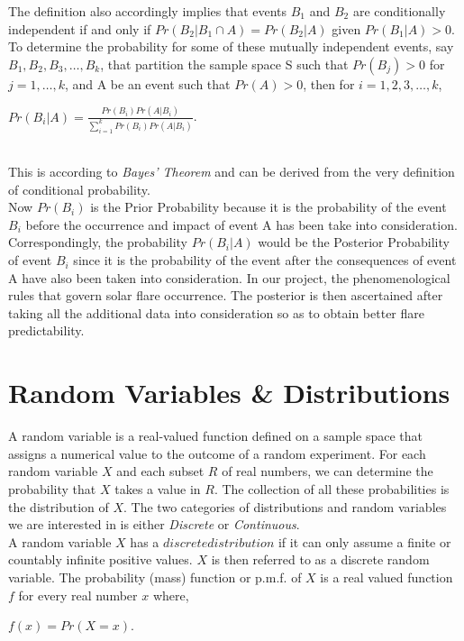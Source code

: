 \documentclass[12pt,twoside]{reedthesis}
\begin{document}
\begin{enumerate}
\begin{enumerate}
The definition also accordingly implies that events $B_1$ and $B_2$ are conditionally independent if and only if $Pr(B_2 | B_1 \cap A) = Pr(B_2 | A)$ given $Pr(B_1 | A) > 0$. \\

To determine the probability for some of these mutually independent events, say $B_1, B_2, B_3, \dotsc, B_k$, that partition the sample space S such that $Pr(B_j) > 0$ for $j = 1, \dotsc, k$, and A be an event such that $Pr(A) > 0$, then for $i = 1, 2, 3, \dotsc , k$,
\begin{center}
$Pr(B_i | A) =  \frac{Pr⁡(B_i )  Pr⁡(A | B_i)}{\sum\limits_{i=1}^k Pr(B_i)  Pr(A|B_i)}$.
\end{center}\\

This is according to \textit{Bayes’ Theorem} and can be derived from the very definition of conditional probability. \\

Now $Pr(B_i)$ is the Prior Probability because it is the probability of the event $B_i$ before the occurrence and impact of event A has been take into consideration. Correspondingly, the probability $Pr(B_i | A)$ would be the Posterior Probability of event $B_i$ since it is the probability of the event after the consequences of event A have also been taken into consideration. In our project, the phenomenological rules that govern solar flare occurrence. The posterior is then ascertained after taking all the additional data into consideration so as to obtain better flare predictability.  

\section{Random Variables & Distributions}

A random variable is a real-valued function defined on a sample space that assigns a numerical value to the outcome of a random experiment. For each random variable $X$ and each subset $R$ of real numbers, we can determine the probability that $X$ takes a value in $R$. The collection of all these probabilities is the distribution of $X$. The two categories of distributions and random variables we are interested in is either \textit{Discrete} or \textit{Continuous}.\\ 

A random variable $X$ has a $discrete distribution$ if it can only assume a finite or countably infinite positive values. $X$ is then referred to as a discrete random variable. The probability (mass) function or p.m.f. of $X$ is a real valued function $f$ for every real number $x$ where, 
\begin{center}
$f(x) = Pr(X = x)$.
\end{center}\\


\end{enumerate}
\end{enumerate}
\end{document}
